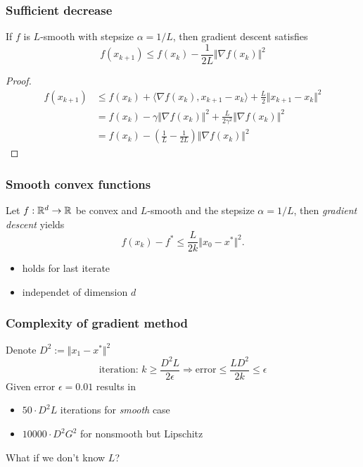 \documentclass{beamer}
\begin{document}
\begin{frame}
  \frametitle{Sufficient decrease}
  \begin{lemma}%
    If $f$ is $L$-smooth with stepsize $\alpha = 1/L$, then gradient descent satisfies
    \begin{equation}
      f(x_{k+1}) \le f(x_k) - \frac{1}{2L} \Vert \nabla f(x_k) \Vert^2
    \end{equation}
  \end{lemma}
  \begin{proof}
    \begin{equation}
      \begin{aligned}
        f(x_{k+1}) &\le f(x_k) + \langle \nabla f(x_k), x_{k+1}-x_k \rangle + \frac{L}{2}\Vert x_{k+1}-x_k \Vert^2 \\
        &= f(x_k) - \gamma \Vert \nabla f(x_k) \Vert^2 + \frac{L}{2 \gamma^2} \Vert \nabla f(x_k) \Vert^2 \\
        &= f(x_k) - \left(\frac{1}{L} - \frac{1}{2L}\right) \Vert \nabla f(x_k) \Vert^2
      \end{aligned}
    \end{equation}
  \end{proof}
\end{frame}


\begin{frame}
  \frametitle{Smooth convex functions}
  \begin{theorem}
    Let $f: \mathbb{R}^d \to \mathbb{R}$ be convex and $L$-smooth and the stepsize $\alpha=1/L$, then
    \emph{gradient descent} yields
    \begin{equation}
      f(x_k)-f^* \le \frac{L}{2k}\Vert x_0-x^* \Vert^2.
    \end{equation}
  \end{theorem}
  \begin{itemize}
    \item holds for last iterate
    \item independet of dimension $d$
  \end{itemize}
\end{frame}

\begin{frame}
  \frametitle{Complexity of gradient method}
  Denote $D^2 := \Vert x_1- x^* \Vert^2$
  \begin{equation}
    \text{iteration: } k \ge \frac{D^2 L}{2 \epsilon} \Rightarrow \text{error} \le \frac{L D^2}{2 k} \le \epsilon
  \end{equation}
  Given error $\epsilon=0.01$ results in
  \begin{itemize}
    \item $50 \cdot D^2 L$ iterations for \textit{smooth} case
      \item $10 000 \cdot D^2 G^2$ for nonsmooth but Lipschitz
  \end{itemize}

  What if we don't know $L$?
\end{frame}
\end{document}

